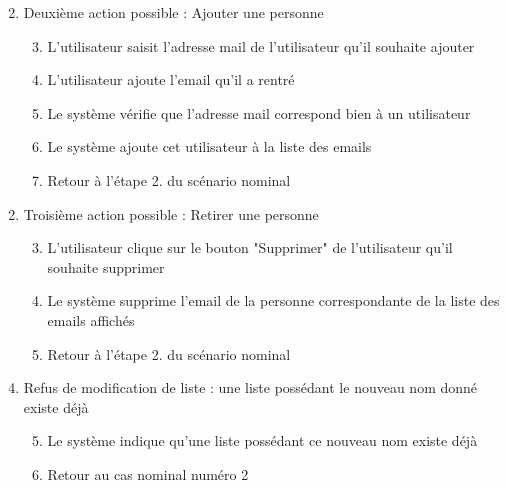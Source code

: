 \begin{itemize}
\begin{itemize}
        \begin{enumerate}[{1{a}.}]\setcounter{enumi}{1}
            \item Deuxième action possible : Ajouter une personne
            \begin{enumerate}[{1.}]\setcounter{enumii}{2}
                \item L'utilisateur saisit l'adresse mail de l'utilisateur qu'il souhaite ajouter
                \item L'utilisateur ajoute l'email qu'il a rentré
                \item Le système vérifie que l'adresse mail correspond bien à un utilisateur 
                \item Le système ajoute cet utilisateur à la liste des emails 
                \item Retour à l'étape 2. du scénario nominal
            \end{enumerate}
        \end{enumerate}
        \begin{enumerate}[{1{b}.}]\setcounter{enumi}{1}
            \item Troisième action possible : Retirer une personne
            \begin{enumerate}[{1.}]\setcounter{enumii}{2}
                \item L'utilisateur clique sur le bouton "Supprimer" de l'utilisateur qu'il souhaite supprimer
                \item Le système supprime l'email de la personne correspondante de la liste des emails affichés
                \item Retour à l'étape 2. du scénario nominal
            \end{enumerate}
        \end{enumerate}
        
        \begin{enumerate}[{1{a}.}]\setcounter{enumi}{3}
            \item Refus de modification de liste : une liste possédant le nouveau nom donné existe déjà
            \begin{enumerate}[{1.}]\setcounter{enumii}{4}
                \item Le système indique qu'une liste possédant ce nouveau nom existe déjà
                \item Retour au cas nominal numéro 2
            \end{enumerate}
        \end{enumerate}
        

\end{itemize}
\end{itemize}
